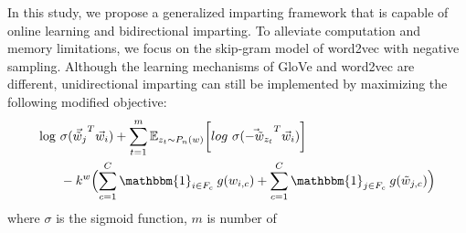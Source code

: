 \documentclass[11pt,a4paper]{article}
\newcommand{\indicator}{\ensuremath{\mathbbm{1}}}
\begin{document}
In this study, we propose a generalized imparting framework that is capable of online learning and bidirectional imparting. To alleviate computation and memory limitations, we focus on the skip-gram model of word2vec with negative sampling.
Although the learning mechanisms of GloVe and word2vec are
different, unidirectional imparting can still be implemented
by maximizing the following modified objective:
\begin{align}
\begin{split}
\log ~ & \sigma ({\vec{\tilde{w}}_{j}}^T \vec{w}_{i}) + \sum_{t = 1}^{m} {\mathbb{E}}_{z_t \sim P_n(w)} \bigg[ log ~ \sigma({\vec{-\tilde{w}}_{z_t}}^T \vec{w}_{i}) \bigg] \\ 
& -k^w \Bigl(  \sum_{c=1}^{C} \indicator_{i\in{}F_c} \: g(w_{i,c}) + \sum_{c=1}^{C} \indicator_{j \in F_c} \: g(\tilde{w}_{j,c}) \Bigr)
\end{split}
\label{eq:word2vec_uni}
\end{align}
where $\sigma$ is the sigmoid function, $m$ is number of
\end{document}
